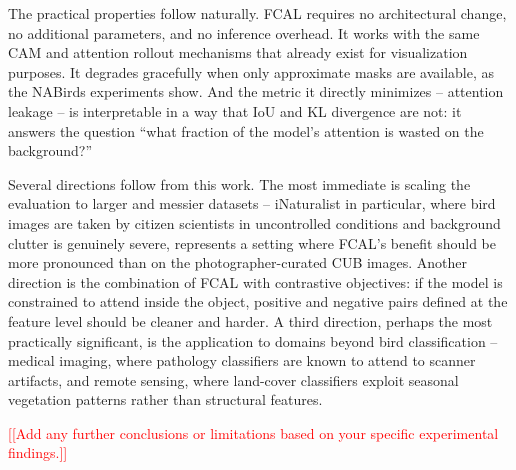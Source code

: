 \documentclass[journal]{IEEEtran}
\newcommand{\ph}[1]{\textcolor{red}{[#1]}}
\begin{document}
The practical properties follow naturally. FCAL requires no
architectural change, no additional parameters, and no inference
overhead. It works with the same CAM and attention rollout
mechanisms that already exist for visualization purposes. It
degrades gracefully when only approximate masks are available,
as the NABirds experiments show. And the metric it directly
minimizes -- attention leakage -- is interpretable in a way
that IoU and KL divergence are not: it answers the question
``what fraction of the model's attention is wasted on the
background?''

Several directions follow from this work. The most immediate
is scaling the evaluation to larger and messier datasets --
iNaturalist in particular, where bird images are taken by
citizen scientists in uncontrolled conditions and background
clutter is genuinely severe, represents a setting where FCAL's
benefit should be more pronounced than on the
photographer-curated CUB images. Another direction is the
combination of FCAL with contrastive objectives: if the model
is constrained to attend inside the object, positive and
negative pairs defined at the feature level should be cleaner
and harder. A third direction, perhaps the most practically
significant, is the application to domains beyond bird
classification -- medical imaging, where pathology classifiers
are known to attend to scanner artifacts, and remote sensing,
where land-cover classifiers exploit seasonal vegetation
patterns rather than structural features.

\ph{[Add any further conclusions or limitations based on your
specific experimental findings.]}
\end{document}
